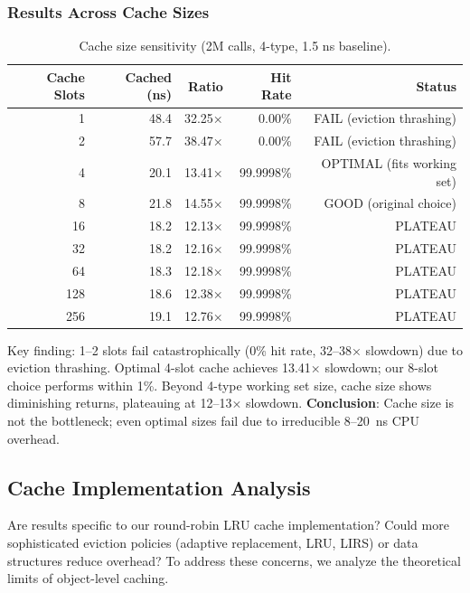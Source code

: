 \documentclass[sigplan,final,acmsmall,review,screen]{acmart}
\begin{document}
\subsubsection{Results Across Cache Sizes}

\begin{table}[h!]
\centering
\small
\caption{Cache size sensitivity (2M calls, 4-type, 1.5 ns baseline).}
\label{tab:cache-size}
\begin{tabular}{@{}rrrrr@{}}
\toprule
\textbf{Cache Slots} & \textbf{Cached (ns)} & \textbf{Ratio} & \textbf{Hit Rate} & \textbf{Status} \\
\midrule
1   & 48.4  & 32.25× & 0.00\%     & FAIL (eviction thrashing) \\
2   & 57.7  & 38.47× & 0.00\%     & FAIL (eviction thrashing) \\
4   & 20.1  & 13.41× & 99.9998\%  & OPTIMAL (fits working set) \\
8   & 21.8  & 14.55× & 99.9998\%  & GOOD (original choice) \\
16  & 18.2  & 12.13× & 99.9998\%  & PLATEAU \\
32  & 18.2  & 12.16× & 99.9998\%  & PLATEAU \\
64  & 18.3  & 12.18× & 99.9998\%  & PLATEAU \\
128 & 18.6  & 12.38× & 99.9998\%  & PLATEAU \\
256 & 19.1  & 12.76× & 99.9998\%  & PLATEAU \\
\bottomrule
\end{tabular}
\end{table}

Key finding: 1--2 slots fail catastrophically (0\% hit rate, 32--38× slowdown) due to eviction thrashing. Optimal 4-slot cache achieves 13.41× slowdown; our 8-slot choice performs within 1\%. Beyond 4-type working set size, cache size shows diminishing returns, plateauing at 12--13× slowdown. \textbf{Conclusion}: Cache size is not the bottleneck; even optimal sizes fail due to irreducible 8--20~ns CPU overhead.


\subsection{Cache Implementation Analysis}
\label{sec:cache-implementation}

Are results specific to our round-robin LRU cache implementation?
Could more sophisticated eviction policies (adaptive replacement, LRU, LIRS) or data structures
reduce overhead? To address these concerns, we analyze the theoretical limits of object-level caching.
\end{document}
